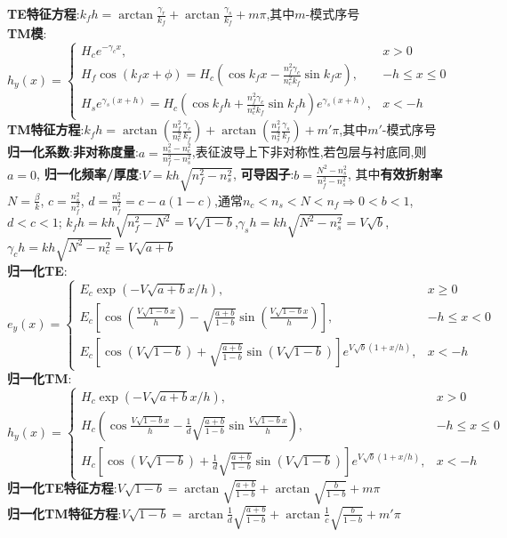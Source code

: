 \documentclass[a4paper,10pt]{article}
\begin{document}
\begin{multicols*}{2}
\textbf{TE特征方程}:$k_fh=\arctan\frac{\gamma_r}{k_f}+\arctan\frac{\gamma_s}{k_f}+m\pi$,其中$m$-模式序号\\
\textbf{TM模}:$h_y(x)=\left\{\begin{array}{ll}
    H_ce^{-\gamma_cx},&x>0\\
    H_f\cos(k_fx+\phi)=H_c(\cos k_fx-\frac{n_f^2\gamma_c}{n_c^2k_f}\sin k_fx),&-h\leq x\leq 0\\
    H_se^{\gamma_s(x+h)}=H_c(\cos k_fh+\frac{n_f^2\gamma_c}{n_c^2k_f}\sin k_fh)e^{\gamma_s(x+h)},&x<-h
\end{array}\right.$\\
\textbf{TM特征方程}:$k_fh=\arctan(\frac{n_f^2}{n_c^2}\frac{\gamma_c}{k_f})+\arctan(\frac{n_f^2}{n_s^2}\frac{\gamma_s}{k_f})+m'\pi$,其中$m'$-模式序号\\
\textbf{归一化系数}:\textbf{非对称度量}:$a=\frac{n_s^2-n_c^2}{n_f^2-n_s^2}$,表征波导上下非对称性,若包层与衬底同,则$a=0$,%
    \textbf{归一化频率/厚度}:$V=kh\sqrt{n_f^2-n_s^2}$,%
    \textbf{可导因子}:$b=\frac{N^2-n_s^2}{n_f^2-n_s^2}$,%
    其中\textbf{有效折射率}$N=\frac{\beta}{k}$,%
    $c=\frac{n_s^2}{n_f^2}$,%
    $d=\frac{n_c^2}{n_f^2}=c-a(1-c)$,通常$n_c<n_s<N<n_f\Rightarrow 0<b<1$,$d<c<1$;%
    $k_fh=kh\sqrt{n_f^2-N^2}=V\sqrt{1-b}$,$\gamma_sh=kh\sqrt{N^2-n_s^2}=V\sqrt{b}$,$\gamma_ch=kh\sqrt{N^2-n_c^2}=V\sqrt{a+b}$\\
\textbf{归一化TE}:{\tiny$e_y(x)=\left\{\begin{array}{ll}
    E_c\exp(-V\sqrt{a+b}x/h),&x\geq 0\\
    E_c[\cos(\frac{V\sqrt{1-b}x}{h})-\sqrt{\frac{a+b}{1-b}}\sin(\frac{V\sqrt{1-b}x}{h})],&-h\leq x<0\\
    E_c[\cos(V\sqrt{1-b})+\sqrt{\frac{a+b}{1-b}}\sin(V\sqrt{1-b})]e^{V\sqrt{b}(1+x/h)},&x<-h
\end{array}\right.$}\\
\textbf{归一化TM}:{\tiny$h_y(x)=\left\{\begin{array}{ll}
    H_c\exp(-V\sqrt{a+b}x/h),&x>0\\
    H_c(\cos\frac{V\sqrt{1-b}x}{h}-\frac{1}{d}\sqrt{\frac{a+b}{1-b}}\sin\frac{V\sqrt{1-b}x}{h}),&-h\leq x\leq 0\\
    H_c[\cos(V\sqrt{1-b})+\frac{1}{d}\sqrt{\frac{a+b}{1-b}}\sin(V\sqrt{1-b})]e^{V\sqrt{b}(1+x/h)},&x<-h
\end{array}\right.$}\\
\textbf{归一化TE特征方程}:$V\sqrt{1-b}=\arctan\sqrt{\frac{a+b}{1-b}}+\arctan\sqrt{\frac{b}{1-b}}+m\pi$\\
\textbf{归一化TM特征方程}:$V\sqrt{1-b}=\arctan\frac{1}{d}\sqrt{\frac{a+b}{1-b}}+\arctan\frac{1}{c}\sqrt{\frac{b}{1-b}}+m'\pi$\\

\end{multicols*}
\end{document}
